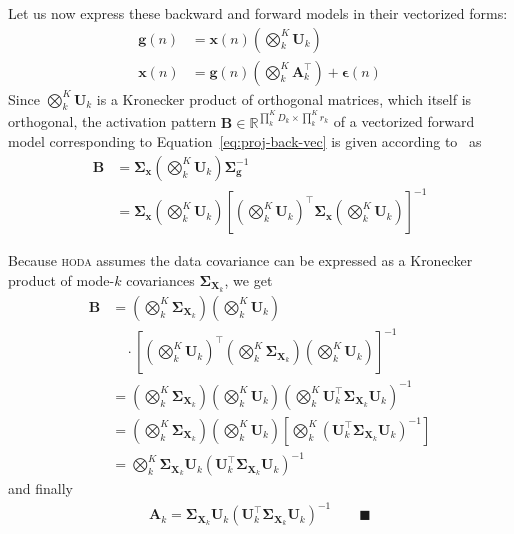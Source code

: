 \documentclass[twocolumn]{article}
\newcommand{\mat}[1]{\mathbf{#1}} %
\renewcommand{\vec}[1]{\mathbf{#1}} %
\begin{document}
Let us now express these backward and forward models in their vectorized forms:
\begin{subequations}
	\label{eq:proj-n}
	\begin{align}
		\vec{g}(n) & = \vec{x}(n)\left(\bigotimes_k^K\mat{U}_k\right)
		\label{eq:proj-back-vec}                                                  \\
		\vec{x}(n) & = \vec{g}(n)\left(\bigotimes_k^K\mat{A}_k^\intercal\right) +
		\vec{\boldsymbol\epsilon}(n)
		\label{eq:proj-fwd-vec}
	\end{align}
\end{subequations}
Since $\bigotimes_k^K\mat{U}_k$ is a Kronecker product of orthogonal matrices,
which itself is orthogonal, the activation pattern
$\mat{B}\in\mathbb{R}^{\prod_k^KD_k\times\prod_k^Kr_k} $ of a vectorized forward model
corresponding to Equation~\ref{eq:proj-back-vec} is given according
to~\cite{Haufe2014} as
\begin{align*}
	\mat{B} & =
	\mat{\Sigma}_\vec{x}\left(\bigotimes_k^K\mat{U}_k\right)\mat{\Sigma}_\vec{g}^{-1} \\
	        & =
	\mat{\Sigma}_\vec{x}\left(\bigotimes_k^K\mat{U}_k\right)\left[\left(\bigotimes_k^K\mat{U}_k\right)^\intercal\mat{\Sigma_\vec{x}}\left(\bigotimes_k^K\mat{U}_k\right)\right]^{-1}
\end{align*}

Because \textsc{hoda} assumes the data covariance can be expressed as a
Kronecker product of mode-$k$ covariances
$\mat{\Sigma}_{\mat{X}_k}$, we get
\begin{align*}
	\mat{B} & =
	\left(\bigotimes_k^K\mat{\Sigma}_{\mat{X}_k}\right)\left(\bigotimes_k^K\mat{U}_k\right)
  \\
          & \quad \cdot
          \left[\left(\bigotimes_k^K\mat{U}_k\right)^\intercal\left(\bigotimes_k^K\mat{\Sigma}_{\mat{X}_k}\right)\left(\bigotimes_k^K\mat{U}_k\right)\right]^{-1}
	\\
	        &
	=\left(\bigotimes_k^K\mat{\Sigma}_{\mat{X}_k}\right)\left(\bigotimes_k^K\mat{U}_k\right)\left(\bigotimes_k^K\mat{U}_k^\intercal\mat{\Sigma}_{\mat{X}_k}\mat{U}_k\right)^{-1} \\
	        &
	=\left(\bigotimes_k^K\mat{\Sigma}_{\mat{X}_k}\right)\left(\bigotimes_k^K\mat{U}_k\right)\left[\bigotimes_k^K\left(\mat{U}_k^\intercal\mat{\Sigma}_{\mat{X}_k}\mat{U}_k\right)^{-1}\right]
	\\
	        & = \bigotimes_k^K \mat{\Sigma}_{\mat{X}_k}
	\mat{U}_k\left(\mat{U}_k^\intercal\mat{\Sigma}_{\mat{X}_k}\mat{U}_k\right)^{-1}
\end{align*}
and finally
\begin{align*}
  \mat{A}_k = \mat{\Sigma}_{\mat{X}_k}
	\mat{U}_k\left(\mat{U}_k^\intercal\mat{\Sigma}_{\mat{X}_k}\mat{U}_k\right)^{-1}
\qquad\blacksquare
\end{align*}
\end{document}

